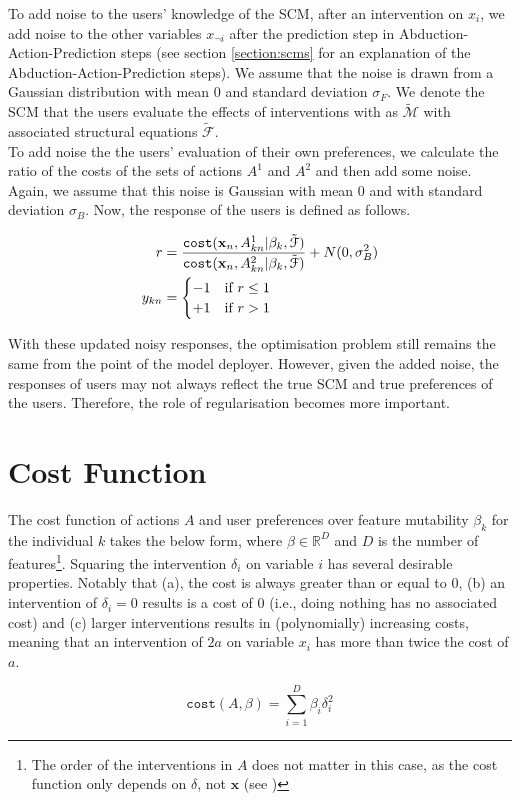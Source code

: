 To add noise to the users' knowledge of the SCM, after an intervention on $x_i$, we add noise to the other variables $x_{\neg i}$ after the prediction step in Abduction-Action-Prediction steps \citep{pearl2016causal} (see section \ref{section:scms} for an explanation of the Abduction-Action-Prediction steps). We assume that the noise is drawn from a Gaussian distribution with mean 0 and standard deviation $\sigma_F$. We denote the SCM that the users evaluate the effects of interventions with as $\tilde{\mathcal{M}}$ with associated structural equations $\tilde{\mathcal{F}}$.\\

To add noise the the users' evaluation of their own preferences, we calculate the ratio of the costs of the sets of actions $A^1$ and $A^2$ and then add some noise. Again, we assume that this noise is Gaussian with mean 0 and with standard deviation $\sigma_B$. Now, the response of the users is defined as follows.

\begin{align}
	r & = \frac{\operatorname*{\texttt{cost}}(\mathbf{x}_n, A^1_{kn} | \beta_k, \tilde{\mathcal{F}})}{\operatorname*{\texttt{cost}}(\mathbf{x}_n, A^2_{kn} | \beta_k, \tilde{\mathcal{F}})} + N(0, \sigma^2_B) \\ \nonumber
	y_{kn} & = \begin{cases}
		-1 & \text{if } r \leq 1 \\
		+1 & \text{if } r > 1 \\
	\end{cases}
\end{align}

With these updated noisy responses, the optimisation problem still remains the same from the point of the model deployer. However, given the added noise, the responses of users may not always reflect the true SCM and true preferences of the users. Therefore, the role of regularisation becomes more important.

\section{Cost Function}

The cost function of actions $A$ and user preferences over feature mutability $\beta_k$ for the individual $k$ takes the below form, where $\beta \in \mathbb{R}^D$ and $D$ is the number of features\footnote{The order of the interventions in $A$ does not matter in this case, as the cost function only depends on $\delta$, not $\mathbf{x}$ (see )}. Squaring the intervention $\delta_i$ on variable $i$ has several desirable properties. Notably that (a), the cost is always greater than or equal to 0, (b) an intervention of $\delta_i=0$ results is a cost of 0 (i.e., doing nothing has no associated cost) and (c) larger interventions results in (polynomially) increasing costs, meaning that an intervention of $2a$ on variable $x_i$ has more than twice the cost of $a$.

\begin{equation}
	\texttt{cost}(A, \beta) = \sum_{i=1}^D \beta_i \delta^2_i
\end{equation}
